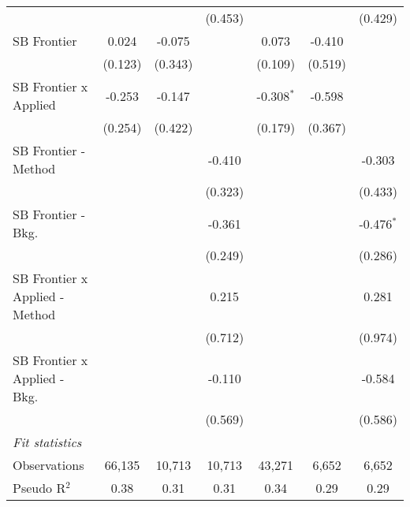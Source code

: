 \begin{tabular}{lcccccc}
                                  &         &         & (0.453)       &              &         & (0.429)\\   
   SB Frontier                    & 0.024   & -0.075  &               & 0.073        & -0.410  &   \\   
                                  & (0.123) & (0.343) &               & (0.109)      & (0.519) &   \\   
   SB Frontier x Applied          & -0.253  & -0.147  &               & -0.308$^{*}$ & -0.598  &   \\   
                                  & (0.254) & (0.422) &               & (0.179)      & (0.367) &   \\   
   SB Frontier - Method           &         &         & -0.410        &              &         & -0.303\\   
                                  &         &         & (0.323)       &              &         & (0.433)\\   
   SB Frontier - Bkg.             &         &         & -0.361        &              &         & -0.476$^{*}$\\   
                                  &         &         & (0.249)       &              &         & (0.286)\\   
   SB Frontier x Applied - Method &         &         & 0.215         &              &         & 0.281\\   
                                  &         &         & (0.712)       &              &         & (0.974)\\   
   SB Frontier x Applied - Bkg.   &         &         & -0.110        &              &         & -0.584\\   
                                  &         &         & (0.569)       &              &         & (0.586)\\   
   \midrule
   \emph{Fit statistics}\\
   Observations                   & 66,135  & 10,713  & 10,713        & 43,271       & 6,652   & 6,652\\  
   Pseudo R$^2$                   & 0.38    & 0.31    & 0.31          & 0.34         & 0.29    & 0.29\\  
   

\end{tabular}
